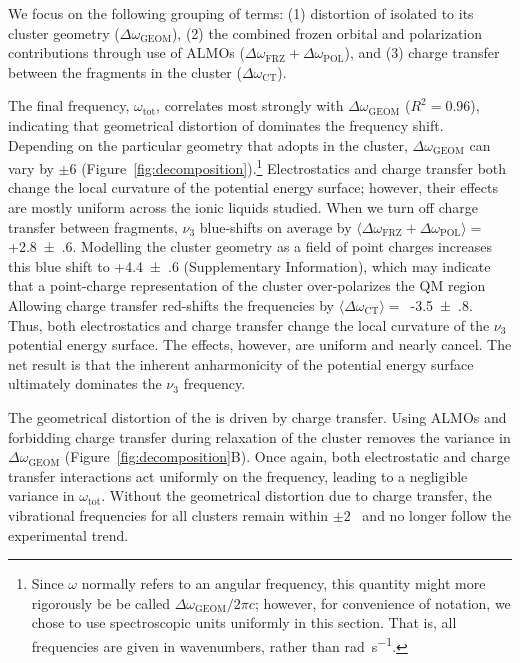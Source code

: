 We focus on the following grouping of terms: (1) distortion of isolated  to its cluster geometry ($\Delta \omega_\mathrm{GEOM}$), (2) the combined frozen orbital and polarization contributions through use of ALMOs ($\Delta \omega_\mathrm{FRZ} + \Delta \omega_\mathrm{POL}$), and (3) charge transfer between the fragments in the cluster ($\Delta \omega_\mathrm{CT}$). 

The final frequency, $\omega_\mathrm{tot}$, correlates most strongly with $\Delta \omega_\mathrm{GEOM}$ ($R^2 = 0.96$), indicating that geometrical distortion of  dominates the frequency shift. Depending on the particular geometry that  adopts in the cluster, $\Delta \omega_\mathrm{GEOM}$ can vary by $\pm$\SI{6}{\wavenumber} (Figure~\ref{fig:decomposition}).\footnote{Since $\omega$ normally refers to an angular frequency, this quantity might more rigorously be be called $\Delta \omega_\mathrm{GEOM} / 2 \pi c$; however, for convenience of notation, we chose to use spectroscopic units uniformly in this section. That is, all frequencies are given in wavenumbers, rather than \si{\radian\per\second}.} Electrostatics and charge transfer both change the local curvature of the potential energy surface; however, their effects are mostly uniform across the ionic liquids studied. When we turn off charge transfer between fragments, $\nu_3$ blue-shifts on average by $\langle \Delta \omega_\mathrm{FRZ} + \Delta \omega_\mathrm{POL} \rangle =$ +\SI[multi-part-units = single]{2.8(6)}{\wavenumber}. Modelling the cluster geometry as a field of point charges increases this blue shift to +\SI[multi-part-units = single]{4.4(6)}{\wavenumber} (Supplementary Information), which may indicate that a point-charge representation of the cluster over-polarizes the QM region~\cite{Bakowies1996,Hu2011} Allowing charge transfer red-shifts the frequencies by $\langle \Delta \omega_\mathrm{CT} \rangle =$~-\SI[multi-part-units = single]{3.5(8)}{\wavenumber}.  Thus, both electrostatics and charge transfer change the local curvature of the $\nu_3$ potential energy surface. The effects, however, are uniform and nearly cancel. The net result is that the inherent anharmonicity of the  potential energy surface ultimately dominates the $\nu_3$ frequency.

The geometrical distortion of the  is driven by charge transfer. Using ALMOs and forbidding charge transfer during relaxation of the cluster removes the variance in $\Delta \omega_\mathrm{GEOM}$ (Figure~\ref{fig:decomposition}B). Once again, both electrostatic and charge transfer interactions act uniformly on the frequency, leading to a negligible variance in $\omega_\mathrm{tot}$. Without the geometrical distortion due to charge transfer, the vibrational frequencies for all clusters remain within $\pm2$~\si{\wavenumber} and no longer follow the experimental trend.

